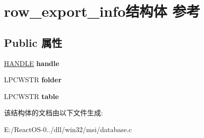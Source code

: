 \hypertarget{structrow__export__info}{}\section{row\+\_\+export\+\_\+info结构体 参考}
\label{structrow__export__info}
\subsection*{Public 属性}
\begin{DoxyCompactItemize}
\item 
\mbox{\label{structrow__export__info_ae55668710dcf380027317d12641e007a}} 
\hyperlink{interfacevoid}{H\+A\+N\+D\+LE} {\bfseries handle}
\item 
\mbox{\label{structrow__export__info_ad3f10acb6cbed2e59131f3e226fc156c}} 
L\+P\+C\+W\+S\+TR {\bfseries folder}
\item 
\mbox{\label{structrow__export__info_afcb10b738359b0cbd1feb8407cb5ce50}} 
L\+P\+C\+W\+S\+TR {\bfseries table}
\end{DoxyCompactItemize}


该结构体的文档由以下文件生成\+:\begin{DoxyCompactItemize}
\item 
E\+:/\+React\+O\+S-\/0../dll/win32/msi/database.\+c\end{DoxyCompactItemize}

